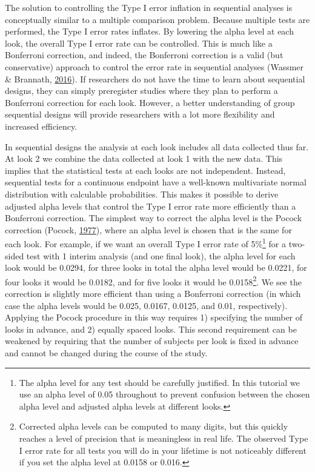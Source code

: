 \documentclass[
  english,
  ,jou, a4paper,floatsintext]{apa6}
\begin{document}
The solution to controlling the Type I error inflation in sequential analyses is conceptually similar to a multiple comparison problem. Because multiple tests are performed, the Type I error rates inflates. By lowering the alpha level at each look, the overall Type I error rate can be controlled. This is much like a Bonferroni correction, and indeed, the Bonferroni correction is a valid (but conservative) approach to control the error rate in sequential analyses (Wassmer \& Brannath, \protect\hyperlink{ref-wassmer_group_2016}{2016}). If researchers do not have the time to learn about sequential designs, they can simply preregister studies where they plan to perform a Bonferroni correction for each look. However, a better understanding of group sequential designs will provide researchers with a lot more flexibility and increased efficiency.

In sequential designs the analysis at each look includes all data collected thus far. At look 2 we combine the data collected at look 1 with the new data. This implies that the statistical tests at each looks are not independent. Instead, sequential tests for a continuous endpoint have a well-known multivariate normal distribution with calculable probabilities. This makes it possible to derive adjusted alpha levels that control the Type I error rate more efficiently than a Bonferroni correction. The simplest way to correct the alpha level is the Pocock correction (Pocock, \protect\hyperlink{ref-pocock_group_1977}{1977}), where an alpha level is chosen that is the same for each look. For example, if we want an overall Type I error rate of 5\%\footnote{The alpha level for any test should be carefully justified. In this tutorial we use an alpha level of 0.05 throughout to prevent confusion between the chosen alpha level and adjusted alpha levels at different looks.} for a two-sided test with 1 interim analysis (and one final look), the alpha level for each look would be 0.0294, for three looks in total the alpha level would be 0.0221, for four looks it would be 0.0182, and for five looks it would be 0.0158\footnote{Corrected alpha levels can be computed to many digits, but this quickly reaches a level of precision that is meaningless in real life. The observed Type I error rate for all tests you will do in your lifetime is not noticeably different if you set the alpha level at 0.0158 or 0.016.}. We see the correction is slightly more efficient than using a Bonferroni correction (in which case the alpha levels would be 0.025, 0.0167, 0.0125, and 0.01, respectively). Applying the Pocock procedure in this way requires 1) specifying the number of looks in advance, and 2) equally spaced looks. This second requirement can be weakened by requiring that the number of subjects per look is fixed in advance and cannot be changed during the course of the study.
\end{document}
